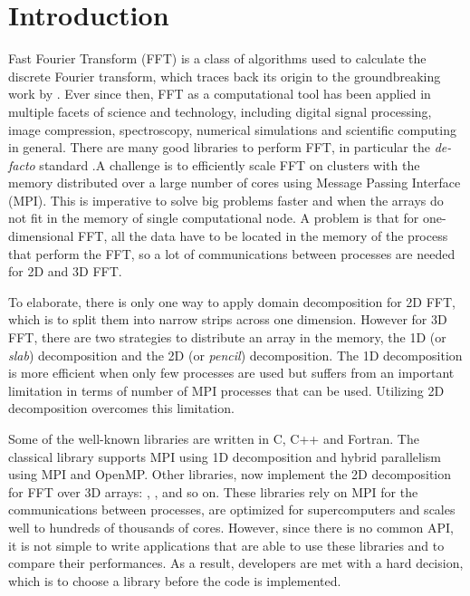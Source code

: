 \documentclass{../jors}
\begin{document}
\section*{Introduction}


Fast Fourier Transform (FFT) is a class of algorithms used to calculate the
discrete Fourier transform, which traces back its origin to the groundbreaking
work by \citet{cooley_tukey}.
%
Ever since then, FFT as a computational tool has been applied in multiple
facets of science and technology, including digital signal processing, image
compression, spectroscopy, numerical simulations and scientific computing in
general. There are many good libraries to perform FFT, in particular the
\emph{de-facto} standard  \citep{frigo2005design}.\@ A challenge
is to efficiently scale FFT on clusters with the memory distributed over a
large number of cores using Message Passing Interface (MPI). This is imperative
to solve big problems faster and when the arrays do not fit in the memory of
single computational node.
%
A problem is that for one-dimensional FFT, all the data have to be located in the
memory of the process that perform the FFT, so a lot of communications between
processes are needed for 2D and 3D FFT.

To elaborate, there is only one way to apply domain decomposition for 2D FFT,
which is to split them into narrow strips across one dimension. However for 3D
FFT, there are two strategies to distribute an array in the memory, the 1D (or
\emph{slab}) decomposition and the 2D (or \emph{pencil}) decomposition. The 1D
decomposition is more efficient when only few processes are used but suffers
from an important limitation in terms of number of MPI processes that can be
used. Utilizing 2D decomposition overcomes this limitation.

Some of the well-known libraries are written in C, C++ and Fortran. The classical
 library supports MPI using 1D decomposition and hybrid parallelism
using MPI and OpenMP. Other libraries, now implement the 2D decomposition for
FFT over 3D arrays:  \citep{pippig_pfft2013}, 
\citep{pekurovsky2012p3dfft},  and so on. These libraries
rely on MPI for the communications between processes, are optimized for
supercomputers and scales well to hundreds of thousands of cores. However, since
there is no common API, it is not simple to write applications that are able to
use these libraries and to compare their performances. As a result, developers are
met with a hard decision, which is to choose a library before the code is
implemented.
\end{document}
